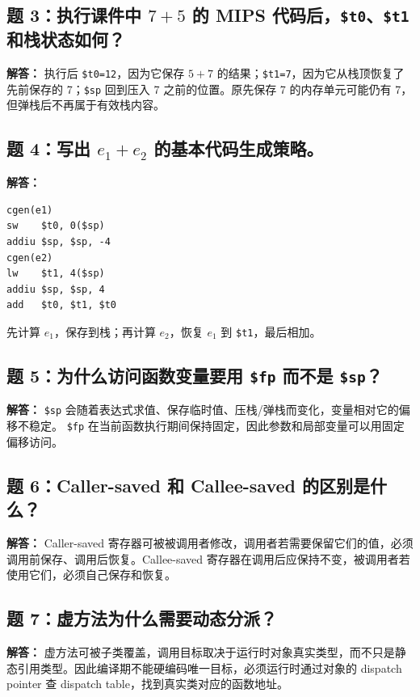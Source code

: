 \documentclass[UTF8,fontset=none,11pt]{ctexart}
\begin{document}
\subsection*{题 3：执行课件中 \texorpdfstring{\(7+5\)}{7+5} 的 MIPS 代码后，\texttt{\$t0}、\texttt{\$t1} 和栈状态如何？}

\textbf{解答：} 执行后 \texttt{\$t0=12}，因为它保存 \(5+7\) 的结果；\texttt{\$t1=7}，因为它从栈顶恢复了先前保存的 7；\texttt{\$sp} 回到压入 7 之前的位置。原先保存 7 的内存单元可能仍有 7，但弹栈后不再属于有效栈内容。

\subsection*{题 4：写出 \texorpdfstring{\(e_1+e_2\)}{e1+e2} 的基本代码生成策略。}

\textbf{解答：}

\begin{verbatim}
cgen(e1)
sw    $t0, 0($sp)
addiu $sp, $sp, -4
cgen(e2)
lw    $t1, 4($sp)
addiu $sp, $sp, 4
add   $t0, $t1, $t0
\end{verbatim}

先计算 \(e_1\)，保存到栈；再计算 \(e_2\)，恢复 \(e_1\) 到 \texttt{\$t1}，最后相加。

\subsection*{题 5：为什么访问函数变量要用 \texttt{\$fp} 而不是 \texttt{\$sp}？}

\textbf{解答：} \texttt{\$sp} 会随着表达式求值、保存临时值、压栈/弹栈而变化，变量相对它的偏移不稳定。 \texttt{\$fp} 在当前函数执行期间保持固定，因此参数和局部变量可以用固定偏移访问。

\subsection*{题 6：Caller-saved 和 Callee-saved 的区别是什么？}

\textbf{解答：} Caller-saved 寄存器可被被调用者修改，调用者若需要保留它们的值，必须调用前保存、调用后恢复。Callee-saved 寄存器在调用后应保持不变，被调用者若使用它们，必须自己保存和恢复。

\subsection*{题 7：虚方法为什么需要动态分派？}

\textbf{解答：} 虚方法可被子类覆盖，调用目标取决于运行时对象真实类型，而不只是静态引用类型。因此编译期不能硬编码唯一目标，必须运行时通过对象的 dispatch pointer 查 dispatch table，找到真实类对应的函数地址。
\end{document}
